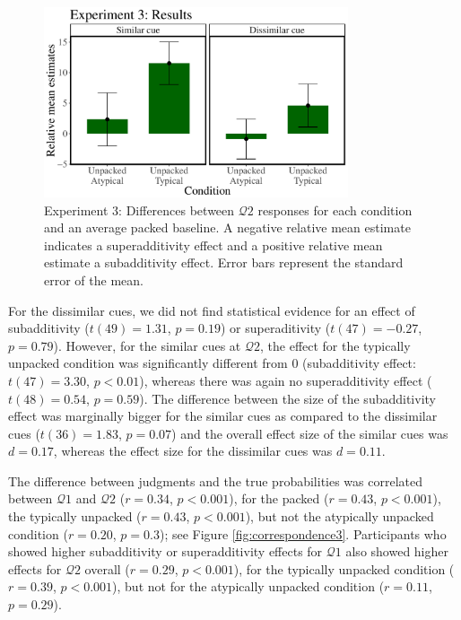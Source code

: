 \begin{figure}
\centering
\includegraphics[width=0.8\textwidth]{figures/amo3results.pdf}
\caption{Experiment 3: Differences between $\mathcal{Q}2$ responses for each condition and an average packed baseline. A negative relative mean estimate indicates a superadditivity effect and a positive relative mean estimate a subadditivity effect. Error bars represent the standard error of the mean.}
\label{fig:meandiffs3}
\end{figure}

For the dissimilar cues, we did not find statistical evidence for an effect of subadditivity ($t(49)=1.31$, $p=0.19$) or superaditivity ($t(47)=-0.27$, $p=0.79$). However, for the similar cues at $\mathcal{Q}2$, the effect for the typically unpacked condition was significantly different from 0 (subadditivity effect: $t(47)=3.30$, $p<0.01$), whereas there was again no superadditivity effect ($t(48)=0.54$, $p=0.59$). The difference between the size of the subadditivity effect was marginally bigger for the similar cues as compared to the dissimilar cues ($t(36)=1.83$, $p=0.07$) and the overall effect size of the similar cues was $d=0.17$, whereas the effect size for the dissimilar cues was $d=0.11$.

The difference between judgments and the true probabilities was correlated between $\mathcal{Q}1$ and $\mathcal{Q}2$ ($r=0.34$, $p<0.001$), for the packed ($r=0.43$, $p<0.001$), the typically unpacked ($r=0.43$, $p<0.001$), but not the atypically unpacked condition ($r=0.20$, $p=0.3$); see Figure \ref{fig:correspondence3}. Participants who showed higher subadditivity or superadditivity effects for $\mathcal{Q}1$ also showed higher effects for $\mathcal{Q}2$ overall ($r=0.29$, $p<0.001$), for the typically unpacked condition ($r=0.39$, $p<0.001$), but not for the atypically unpacked condition ($r=0.11$, $p=0.29$).

